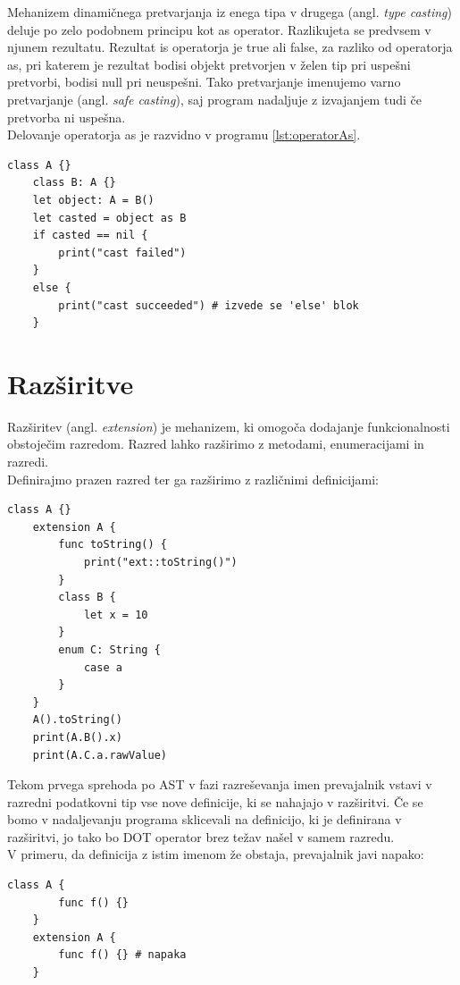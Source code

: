 \documentclass[a4paper, 12p]{book}
\begin{document}
Mehanizem dinamičnega pretvarjanja iz enega tipa v drugega (angl. \textit{type casting}) deluje po zelo podobnem principu kot {\ttfamily as} operator. Razlikujeta se predvsem v njunem rezultatu. Rezultat {\ttfamily is} operatorja je {\ttfamily true} ali {\ttfamily false}, za razliko od operatorja {\ttfamily as}, pri katerem je rezultat bodisi objekt pretvorjen v želen tip pri uspešni pretvorbi, bodisi {\ttfamily null} pri neuspešni. Tako pretvarjanje imenujemo varno pretvarjanje (angl. \textit{safe casting}), saj program nadaljuje z izvajanjem tudi če pretvorba ni uspešna.
\\\indent Delovanje operatorja {\ttfamily as} je razvidno v programu \ref{lst:operatorAs}.
\begin{lstlisting}[caption={Uporaba operatorja {\ttfamily as}.}, captionpos=b, label={lst:operatorAs}]
	class A {}
	class B: A {}
	let object: A = B()
	let casted = object as B
	if casted == nil {
	    print("cast failed")
	}
	else {
	    print("cast succeeded") # izvede se 'else' blok
	}
\end{lstlisting}

\section{Razširitve}

Razširitev (angl. \textit{extension}) je mehanizem, ki omogoča dodajanje funkcionalnosti obstoječim razredom. Razred lahko razširimo z metodami, enumeracijami in razredi. 
\\\indent Definirajmo prazen razred ter ga razširimo z različnimi definicijami:

\begin{lstlisting}[caption={}, captionpos=b]
	class A {}
	extension A {
		func toString() {
			print("ext::toString()")
		}
		class B {
			let x = 10
		}
		enum C: String {
			case a
		}
	}
	A().toString()
	print(A.B().x)
	print(A.C.a.rawValue)
\end{lstlisting}

Tekom prvega sprehoda po AST v fazi razreševanja imen prevajalnik vstavi v razredni podatkovni tip vse nove definicije, ki se nahajajo v razširitvi. Če se bomo v nadaljevanju programa sklicevali na definicijo, ki je definirana v razširitvi, jo tako bo DOT operator brez težav našel v samem razredu. \\
\indent V primeru, da definicija z istim imenom že obstaja, prevajalnik javi napako:

\begin{lstlisting}[caption={}, captionpos=b]
	class A {
	    func f() {}
	}
	extension A {
	    func f() {} # napaka
	}
\end{lstlisting}
\end{document}
